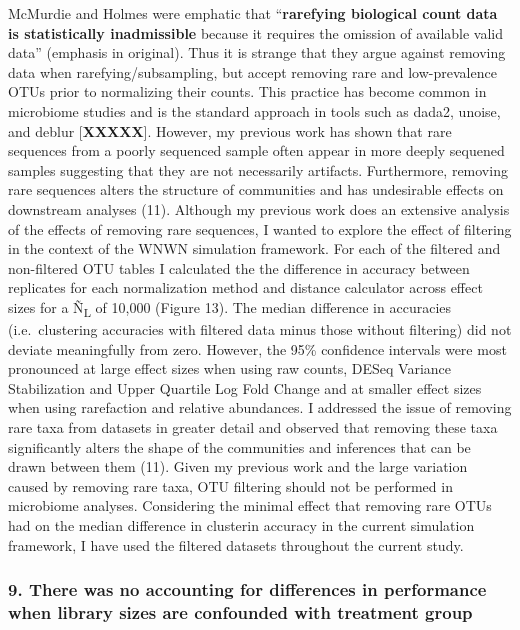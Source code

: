 \documentclass[
]{article}
\begin{document}
McMurdie and Holmes were emphatic that ``\textbf{rarefying biological
count data is statistically inadmissible} because it requires the
omission of available valid data'' (emphasis in original). Thus it is
strange that they argue against removing data when
rarefying/subsampling, but accept removing rare and low-prevalence OTUs
prior to normalizing their counts. This practice has become common in
microbiome studies and is the standard approach in tools such as dada2,
unoise, and deblur {[}\textbf{XXXXX}{]}. However, my previous work has
shown that rare sequences from a poorly sequenced sample often appear in
more deeply sequened samples suggesting that they are not necessarily
artifacts. Furthermore, removing rare sequences alters the structure of
communities and has undesirable effects on downstream analyses (11).
Although my previous work does an extensive analysis of the effects of
removing rare sequences, I wanted to explore the effect of filtering in
the context of the WNWN simulation framework. For each of the filtered
and non-filtered OTU tables I calculated the the difference in accuracy
between replicates for each normalization method and distance calculator
across effect sizes for a Ñ\textsubscript{L} of 10,000 (Figure 13). The
median difference in accuracies (i.e.~clustering accuracies with
filtered data minus those without filtering) did not deviate
meaningfully from zero. However, the 95\% confidence intervals were most
pronounced at large effect sizes when using raw counts, DESeq Variance
Stabilization and Upper Quartile Log Fold Change and at smaller effect
sizes when using rarefaction and relative abundances. I addressed the
issue of removing rare taxa from datasets in greater detail and observed
that removing these taxa significantly alters the shape of the
communities and inferences that can be drawn between them (11). Given my
previous work and the large variation caused by removing rare taxa, OTU
filtering should not be performed in microbiome analyses. Considering
the minimal effect that removing rare OTUs had on the median difference
in clusterin accuracy in the current simulation framework, I have used
the filtered datasets throughout the current study.

\hypertarget{there-was-no-accounting-for-differences-in-performance-when-library-sizes-are-confounded-with-treatment-group}{%
\subsubsection{9. There was no accounting for differences in performance
when library sizes are confounded with treatment
group}\label{there-was-no-accounting-for-differences-in-performance-when-library-sizes-are-confounded-with-treatment-group}}
\end{document}
